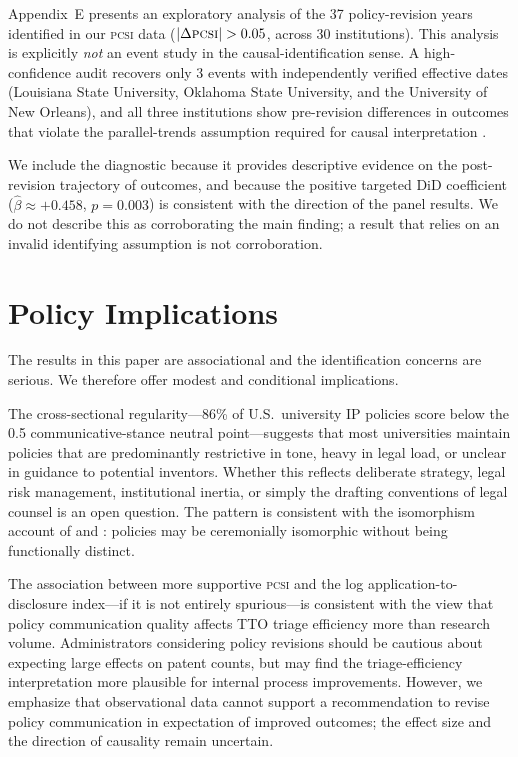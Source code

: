 \documentclass[12pt]{article}
\newcommand{\PCSI}{\textsc{pcsi}}
\begin{document}
Appendix~E presents an exploratory analysis of the 37 policy-revision years identified
in our \PCSI{} data ($|\Delta\PCSI{}|>0.05$, across 30 institutions). This analysis
is explicitly \emph{not} an event study in the causal-identification sense. A
high-confidence audit recovers only 3 events with independently verified effective
dates (Louisiana State University, Oklahoma State University, and the University of
New Orleans), and all three institutions show pre-revision differences in outcomes
that violate the parallel-trends assumption required for causal interpretation
\citep{callaway2021, roth2022, rambachanroth2023}.

We include the diagnostic because it provides descriptive evidence on the
post-revision trajectory of outcomes, and because the positive targeted DiD
coefficient ($\hat\beta\approx+0.458$, $p=0.003$) is consistent with the
direction of the panel results. We do not describe this as corroborating the
main finding; a result that relies on an invalid identifying assumption is not
corroboration.

\section{Policy Implications}
\label{sec:policy}

The results in this paper are associational and the identification concerns are serious.
We therefore offer modest and conditional implications.

The cross-sectional regularity---86\% of U.S.\ university IP policies score below the
0.5 communicative-stance neutral point---suggests that most universities maintain
policies that are predominantly restrictive in tone, heavy in legal load, or unclear
in guidance to potential inventors. Whether this reflects deliberate strategy, legal
risk management, institutional inertia, or simply the drafting conventions of legal
counsel is an open question. The pattern is consistent with the isomorphism account
of \citet{dimaggio1983} and \citet{meyer1977}: policies may be ceremonially isomorphic
without being functionally distinct.

The association between more supportive \PCSI{} and the log application-to-disclosure
index---if it is not entirely spurious---is consistent with the view that policy
communication quality affects TTO triage efficiency more than research volume.
Administrators considering policy revisions should be cautious about expecting
large effects on patent counts, but may find the triage-efficiency interpretation
more plausible for internal process improvements. However, we emphasize that observational
data cannot support a recommendation to revise policy communication in expectation
of improved outcomes; the effect size and the direction of causality remain uncertain.
\end{document}
